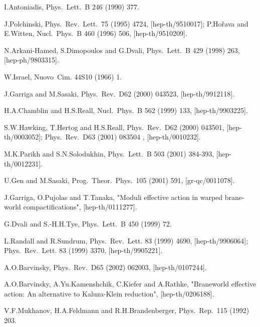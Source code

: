 \documentclass[a4paper,12pt]{article}
\begin{document}
\begin{thebibliography}{99}
I.Antoniadis,
 Phys.\ Lett.\ B {246} (1990) 377.

J.Polchinski,
 Phys.\ Rev.\ Lett.\  {75} (1995) 4724,
 [hep-th/9510017];
P.Ho\v{r}ava and E.Witten,
 Nucl.\ Phys.\ B {460} (1996) 506, [hep-th/9510209].

N.Arkani-Hamed, S.Dimopoulos and G.Dvali,
 Phys.\ Lett.\ B {429} (1998) 263, [hep-ph/9803315].

W.Israel,
 Nuovo\ Cim. {44S10} (1966) 1.

J.Garriga and M.Sasaki,
 Phys.\ Rev.\ D{62} (2000) 043523, [hep-th/9912118].

H.A.Chamblin and H.S.Reall,
 Nucl.\ Phys.\ B {562} (1999) 133, [hep-th/9903225].

S.W.Hawking, T.Hertog and H.S.Reall,
 Phys.\ Rev.\ D{62} (2000) 043501,  [hep-th/0003052];
 Phys.\ Rev.\ D{63} (2001) 083504 , [hep-th/0010232].

 M.K.Parikh and S.N.Solodukhin,
 Phys.\ Lett.\ B {503} (2001) 384-393,
 [hep-th/0012231].

U.Gen and M.Sasaki,
 Prog.\ Theor.\ Phys.\ {105} (2001) 591,
 [gr-qc/0011078].

J.Garriga, O.Pujolas and T.Tanaka,
 "Moduli effective action in warped brane-world compactifications",
 [hep-th/0111277].

 G.Dvali and S.-H.H.Tye, Phys.\ Lett.\ B {450}
           (1999) 72.

L.Randall and R.Sundrum,
 Phys.\ Rev.\ Lett. {83} (1999) 4690, [hep-th/9906064];
 Phys.\ Rev.\ Lett. {83} (1999) 3370, [hep-th/9905221].

A.O.Barvinsky,
 Phys.\ Rev.\ D{65} (2002) 062003, [hep-th/0107244].

A.O.Barvinsky, A.Yu.Kamenshchik, C.Kiefer and A.Rathke,
 "Braneworld effective action: An alternative to Kaluza-Klein
 reduction", [hep-th/0206188].

V.F.Mukhanov, H.A.Feldmann and R.H.Brandenberger,
 Phys.\ Rep.\ {115} (1992) 203.


\end{thebibliography}
\end{document}
